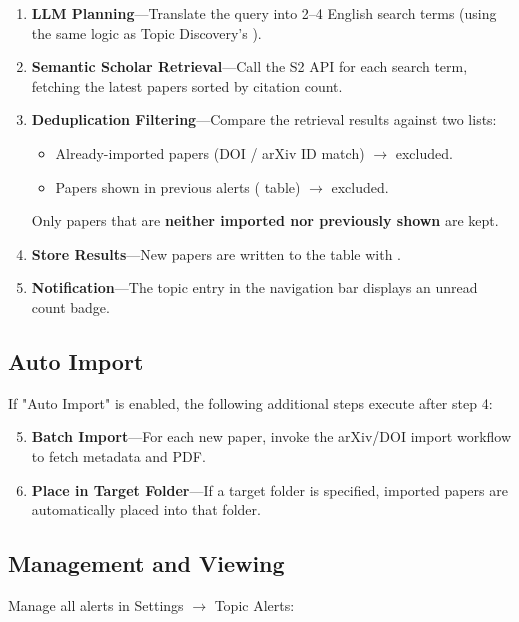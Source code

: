 \begin{enumerate}
  \item \textbf{LLM Planning}---Translate the query into 2--4 English search terms (using the same
    logic as Topic Discovery's ).
  \item \textbf{Semantic Scholar Retrieval}---Call the S2 API for each search term, fetching the
    latest papers sorted by citation count.
  \item \textbf{Deduplication Filtering}---Compare the retrieval results against two lists:
    \begin{itemize}
      \item Already-imported papers (DOI / arXiv ID match) $\to$ excluded.
      \item Papers shown in previous alerts ( table) $\to$ excluded.
    \end{itemize}
    Only papers that are \textbf{neither imported nor previously shown} are kept.
  \item \textbf{Store Results}---New papers are written to the  table
    with .
  \item \textbf{Notification}---The topic entry in the navigation bar displays an unread count
    badge.
\end{enumerate}

\subsection{Auto Import}

If "Auto Import" is enabled, the following additional steps execute after step 4:

\begin{enumerate}
  \setcounter{enumi}{4}
  \item \textbf{Batch Import}---For each new paper, invoke the arXiv/DOI import workflow to fetch
    metadata and PDF.
  \item \textbf{Place in Target Folder}---If a target folder is specified, imported papers are
    automatically placed into that folder.
\end{enumerate}

\subsection{Management and Viewing}

Manage all alerts in Settings $\to$ Topic Alerts:

